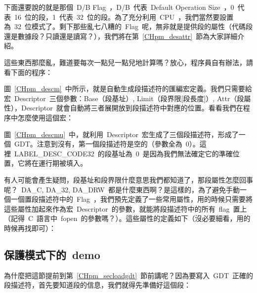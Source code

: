 下面還要說的就是那個~D/B Flag~，D/B~代表~Default Operation Size~，0~代表~16~位的段，1~代表~32~位的段。為了充分利用~CPU~，我們當然要設置為~32~位模式了。剩下那些亂七八糟的~Flag~呢，無非就是提供段的屬性（代碼段還是數據段？只讀還是讀寫？），我們將在第~\ref{CHpm_desattr}~節為大家詳細介紹。

這些東西那麼亂，難道要每次一點兒一點兒地計算嗎？放心，程序員自有辦法，請看下面的程序：

\label{CHpm_descm}

圖~\ref{CHpm_descm}~中所示，就是自動生成段描述符的匯編宏定義。我們只需要給宏~Descriptor~三個參數：Base（段基址）, Limit（段界限[段長度]）, Attr（段屬性），Descriptor~就會自動將三者展開放到段描述符中對應的位置。看看我們在程序中怎麼使用這個宏：

\label{CHpm_descmu}

圖~\ref{CHpm_descmu}~中，就利用~Descriptor~宏生成了三個段描述符，形成了一個~GDT。注意到沒有，第一個段描述符是空的（參數全為~0）。這裡~LABEL\_DESC\_CODE32~的段基址為~0~是因為我們無法確定它的準確位置，它將在運行期被填入。

有人可能會產生疑問，段基址和段界限什麼意思我們都知道了，那段屬性怎麼回事呢？~DA\_C, DA\_32, DA\_DRW~都是什麼東西啊？是這樣的，為了避免手動一個一個置段描述符中的~Flag~，我們預先定義了一些常用屬性，用的時候只需要將這些屬性加起來作為宏~Descriptor~的參數，就能將段描述符中的所有~flag~置上（記得~C~語言中~fopen~的參數嗎？）。這些屬性的定義如下（沒必要細看，用的時候再找即可）：

\label{CHpm_segattr}

\subsection{保護模式下的~demo}

為什麼把這節提前到第~\ref{CHpm_secloadgdt}~節前講呢？因為要寫入~GDT~正確的段描述符，首先要知道段的信息，我們就得先準備好這個段：

